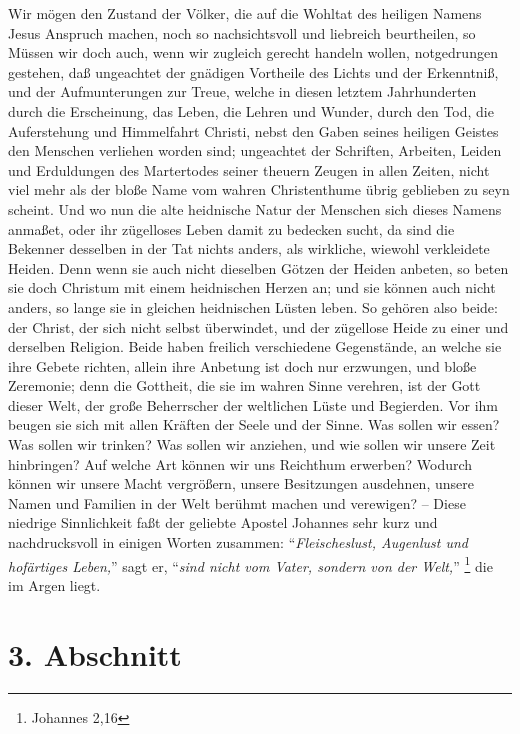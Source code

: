 Wir mögen den Zustand der Völker, die auf die Wohltat des heiligen Namens Jesus
Anspruch machen, noch so nachsichtsvoll und liebreich beurtheilen, so Müssen wir
doch auch, wenn wir zugleich gerecht handeln wollen, notgedrungen gestehen, daß
ungeachtet der gnädigen Vortheile des Lichts und der Erkenntniß, und der
Aufmunterungen zur Treue, welche in diesen letztem Jahrhunderten durch die
Erscheinung, das Leben, die Lehren und Wunder, durch den Tod, die Auferstehung
und Himmelfahrt Christi, nebst den Gaben seines heiligen Geistes den Menschen
verliehen worden sind; ungeachtet der Schriften, Arbeiten, Leiden und
Erduldungen des Martertodes seiner theuern Zeugen in allen Zeiten, nicht viel
mehr als der bloße Name vom wahren Christenthume übrig geblieben zu seyn
scheint. Und wo nun die alte heidnische Natur der Menschen sich dieses Namens
anmaßet, oder ihr zügelloses Leben damit zu bedecken sucht, da sind die Bekenner
desselben in der Tat nichts anders, als wirkliche, wiewohl verkleidete Heiden.
Denn wenn sie auch nicht dieselben Götzen der Heiden anbeten, so beten sie doch
Christum mit einem heidnischen Herzen an; und sie können auch nicht anders, so
lange sie in gleichen heidnischen Lüsten leben. So gehören also beide: der
Christ, der sich nicht selbst überwindet, und der zügellose Heide zu einer und
derselben Religion. Beide haben freilich verschiedene Gegenstände,
an welche sie ihre Gebete richten, allein ihre Anbetung ist doch nur erzwungen,
und bloße Zeremonie; denn die Gottheit, die sie im wahren Sinne verehren, ist
der Gott dieser Welt, der große Beherrscher der weltlichen Lüste und Begierden.
Vor ihm beugen sie sich mit allen Kräften der Seele und der Sinne. Was sollen
wir essen? Was sollen wir trinken? Was sollen wir anziehen, und wie sollen wir
unsere Zeit hinbringen? Auf welche Art können wir uns Reichthum erwerben?
Wodurch können wir unsere Macht vergrößern, unsere Besitzungen ausdehnen, unsere
Namen und Familien in der Welt berühmt machen und verewigen? -- Diese niedrige
Sinnlichkeit faßt der geliebte Apostel Johannes sehr kurz und nachdrucksvoll in
einigen Worten zusammen: "`\textit{Fleischeslust, Augenlust und hofärtiges
Leben,}"' sagt er, "`\textit{sind nicht vom Vater, sondern von der Welt,}"'
\footnote{Johannes 2,16}  die im Argen liegt.

\section{3. Abschnitt}

